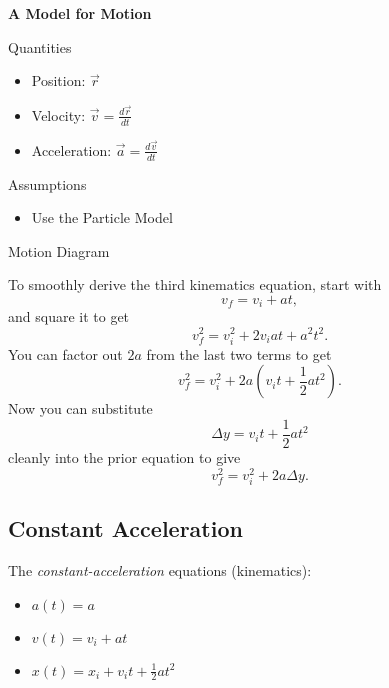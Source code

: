 \documentclass[]{article}
\begin{document}
\begin{PresentSpace}
\textbf{A Model for Motion}
\begin{multicols}{2}
	Quantities
	\begin{itemize}
		\item Position: $\vec{r}$
		\item Velocity: $\vec{v}=\frac{d\vec{r}}{dt}$
		\item Acceleration: $\vec{a}=\frac{d\vec{v}}{dt}$
	\end{itemize}
	\vspace{1cm}
	Assumptions
	\begin{itemize}
		\item Use the Particle Model
	\end{itemize}
\end{multicols}
Motion Diagram
\begin{figure}[h]
	\centering
\end{figure}
\end{PresentSpace}
\newpage
\begin{TeacherMargin}
\noindent To smoothly derive the third kinematics equation, start with
\[
v_{f} = v_{i} + at,
\]
and square it to get
\[
v_{f}^{2} = v_{i}^{2} + 2v_{i}at + a^{2}t^{2}.
\]
You can factor out $2a$ from the last two terms to get
\[
v_{f}^{2} = v_{i}^{2} + 2a\left(v_{i}t + \frac{1}{2}at^{2}\right).
\]
Now you can substitute
\[
\Delta y = v_{i}t + \frac{1}{2}at^{2}
\]
cleanly into the prior equation to give
\[
v_{f}^{2} = v_{i}^{2} + 2a\Delta y.
\]
\end{TeacherMargin}
\begin{PresentSpace}
\vspace{-10pt}
\section*{Constant Acceleration}
\vspace{-10pt}
The \textit{constant-acceleration} equations (kinematics):
\begin{itemize}
	\item $a(t)=a$
	\item $v(t)=v_{i}+at$
	\item $x(t) = x_{i}+v_{i}t+\frac{1}{2}at^{2}$
\end{itemize}
\end{PresentSpace}
\end{document}
